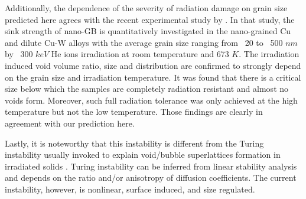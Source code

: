 \documentclass[utf8]{frontiersSCNS} %
\begin{document}
    Additionally, the dependence of the severity of radiation damage on grain size predicted here agrees with the recent experimental study by \citep{mao2019}. In that study, the sink strength of nano-GB is quantitatively investigated in the nano-grained Cu and dilute Cu-W alloys with the average grain size ranging from ~20 to ~500 $nm$ by ~300 $keV$ He ions irradiation at room temperature and 673 $K$. The irradiation induced void volume ratio, size and distribution are confirmed to strongly depend on the grain size and irradiation temperature. It was found that there is a critical size below which the samples are completely radiation resistant and almost no voids form. Moreover, such full radiation tolerance was only achieved at the high temperature but not the low temperature. Those findings are clearly in agreement with our prediction here.
    
    Lastly, it is noteworthy that this instability is different from the Turing instability usually invoked to explain void/bubble superlattices formation in irradiated solids \citep{noble2020,ghoniem2001,krishnanOct1980,gao2018}. Turing instability can be inferred from linear stability analysis and depends on the ratio and/or anisotropy of diffusion coefficients. The current instability, however, is nonlinear, surface induced, and size regulated.
\end{document}
